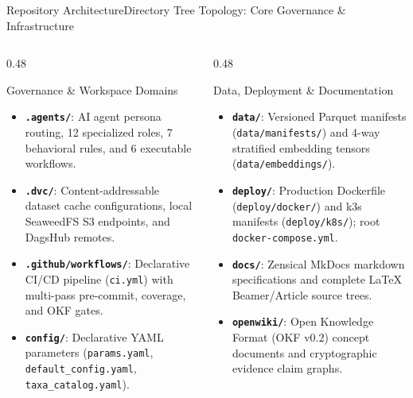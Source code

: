 \begin{frame}{Repository Architecture}{Directory Tree Topology: Core Governance \& Infrastructure}
    \begin{columns}[T]
        \begin{column}{0.48\textwidth}
            \begin{block}{Governance \& Workspace Domains}
                \begin{itemize}\scriptsize
                    \item \textbf{\texttt{.agents/}}: AI agent persona routing, 12 specialized roles, 7 behavioral rules, and 6 executable workflows.
                    \item \textbf{\texttt{.dvc/}}: Content-addressable dataset cache configurations, local SeaweedFS S3 endpoints, and DagsHub remotes.
                    \item \textbf{\texttt{.github/workflows/}}: Declarative CI/CD pipeline (\texttt{ci.yml}) with multi-pass pre-commit, coverage, and OKF gates.
                    \item \textbf{\texttt{config/}}: Declarative YAML parameters (\texttt{params.yaml}, \texttt{default\_config.yaml}, \texttt{taxa\_catalog.yaml}).
                \end{itemize}
            \end{block}
        \end{column}
        \begin{column}{0.48\textwidth}
            \begin{block}{Data, Deployment \& Documentation}
                \begin{itemize}\scriptsize
                    \item \textbf{\texttt{data/}}: Versioned Parquet manifests (\texttt{data/manifests/}) and 4-way stratified embedding tensors (\texttt{data/embeddings/}).
                    \item \textbf{\texttt{deploy/}}: Production Dockerfile (\texttt{deploy/docker/}) and k3s manifests (\texttt{deploy/k8s/}); root \texttt{docker-compose.yml}.
                    \item \textbf{\texttt{docs/}}: Zensical MkDocs markdown specifications and complete LaTeX Beamer/Article source trees.
                    \item \textbf{\texttt{openwiki/}}: Open Knowledge Format (OKF v0.2) concept documents and cryptographic evidence claim graphs.
                \end{itemize}
            \end{block}
        \end{column}
    \end{columns}


\end{frame}
